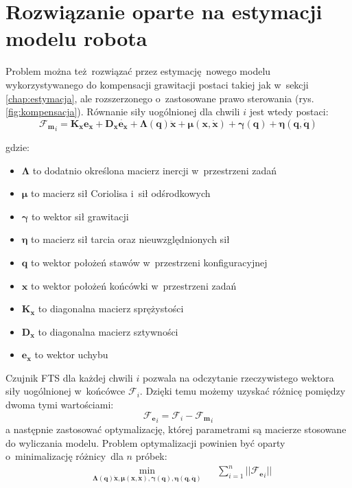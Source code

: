 \section{Rozwiązanie oparte na estymacji modelu robota}
\label{chap:rozw_model}
Problem można też rozwiązać przez estymację nowego modelu wykorzystywanego do kompensacji grawitacji postaci takiej jak w~sekcji \ref{chap:estymacja}, ale rozszerzonego o~zastosowane prawo sterowania \cite{bib:rozw_opt1, bib:rozw_opt2} (rys. \ref{fig:kompensacja}). Równanie siły uogólnionej dla chwili $i$ jest wtedy postaci:
\begin{equation}
\boldsymbol{\mathcal{F}_{m}}_i = \boldsymbol{K_x}\boldsymbol{e_x} + \boldsymbol{D_x}\dot{\boldsymbol{e_x}} + \boldsymbol{\Lambda}(\boldsymbol{q})\boldsymbol{\ddot{x}} + \boldsymbol{\mu}(\boldsymbol{x}, \boldsymbol{\dot{x}}) + \boldsymbol{\gamma}(\boldsymbol{q}) + \boldsymbol{\eta}(\boldsymbol{q}, \boldsymbol{\dot{q}})
\end{equation}

gdzie: 

\begin{itemize}
	\item $\boldsymbol{\Lambda}$ to dodatnio określona macierz inercji w~przestrzeni zadań
	\item $\boldsymbol{\mu}$ to macierz sił Coriolisa i~sił odśrodkowych	
	\item $\boldsymbol{\gamma}$ to wektor sił grawitacji
	\item $\boldsymbol{\eta}$ to macierz sił tarcia oraz nieuwzględnionych sił
	\item $\boldsymbol{q}$ to wektor położeń stawów w~przestrzeni konfiguracyjnej
	\item $\boldsymbol{x}$ to wektor położeń końcówki w~przestrzeni zadań
	\item $\boldsymbol{K_x}$ to diagonalna macierz sprężystości
	\item $\boldsymbol{D_x}$ to diagonalna macierz sztywności
	\item $\boldsymbol{e_x}$ to wektor uchybu
\end{itemize} 


Czujnik FTS dla każdej chwili $i$ pozwala na odczytanie rzeczywistego wektora siły uogólnionej w~końcówce $\boldsymbol{\mathcal{F}}_i$. Dzięki temu możemy uzyskać różnicę pomiędzy dwoma tymi wartościami:
\begin{equation}
\boldsymbol{\mathcal{F}_{e}}_i = \boldsymbol{\mathcal{F}}_{i} - \boldsymbol{\mathcal{F}_{m}}_i
\end{equation}
a następnie zastosować optymalizację, której parametrami są macierze stosowane do wyliczania modelu. Problem optymalizacji powinien być oparty o~minimalizację różnicy dla $n$ próbek:
\begin{equation}
\begin{aligned}
& \underset{\boldsymbol{\Lambda}(\boldsymbol{q})\boldsymbol{\ddot{x}}, \boldsymbol{\mu}(\boldsymbol{x}, \boldsymbol{\dot{x}}), \boldsymbol{\gamma}(\boldsymbol{q}), \boldsymbol{\eta}(\boldsymbol{q}, \boldsymbol{\dot{q}})}{\text{min}}
& & \sum_{i = 1}^{n} || \boldsymbol{\mathcal{F}_{e}}_i ||
\end{aligned}
\end{equation}

